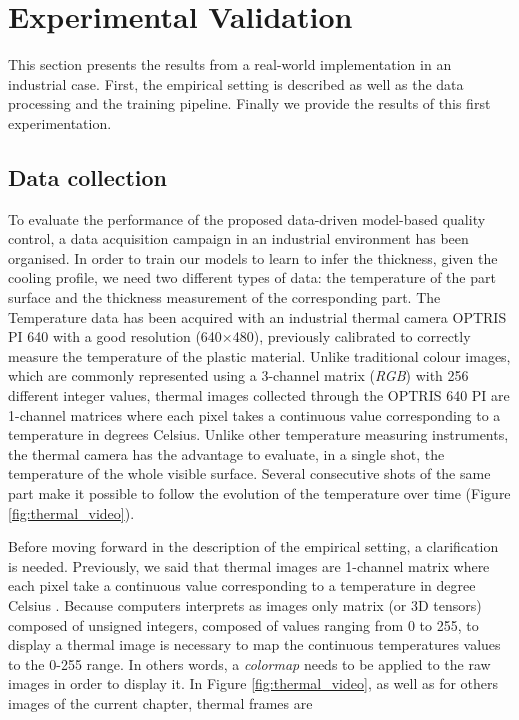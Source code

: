 \section{Experimental Validation} \label{Experimental Validation}

This section presents the results from a real-world implementation in an industrial case. First, the empirical setting is described as well as the data processing and the training pipeline. Finally we provide the results of this first experimentation.

\subsection{Data collection}

To evaluate the performance of the proposed data-driven model-based quality control, a data acquisition campaign in an industrial environment has been organised. In order to train our models to learn to infer the thickness, given the cooling profile, we need two different types of data: the temperature of the part surface and the thickness measurement of the corresponding part. The Temperature data  has been acquired with an industrial thermal camera OPTRIS PI 640 with a good resolution (640$\times$480), previously calibrated to correctly measure the temperature of the plastic material. Unlike traditional colour images, which are commonly represented using a 3-channel matrix (\textit{RGB}) with 256 different integer values, thermal images collected through the OPTRIS 640 PI are 1-channel matrices where each pixel takes a continuous value corresponding to a temperature in degrees Celsius. Unlike other temperature measuring instruments, the thermal camera has the advantage to evaluate, in a single shot, the temperature of the whole visible surface. Several consecutive shots of the same part make it possible to follow the evolution of the temperature over time (Figure \ref{fig:thermal_video}). 

Before moving forward in the description of the empirical setting, a clarification is needed. Previously, we said that thermal images are 1-channel matrix where each pixel take a continuous value corresponding to a temperature in degree Celsius . Because computers interprets as images only matrix (or 3D tensors) composed of unsigned integers, composed of values ranging from 0 to 255, to display a thermal image is necessary to map the continuous temperatures values to the 0-255 range. In others words, a \textit{colormap} needs to be applied to the raw images in order to display it. In Figure \ref{fig:thermal_video}, as well as for others images of the current chapter, thermal frames are 

